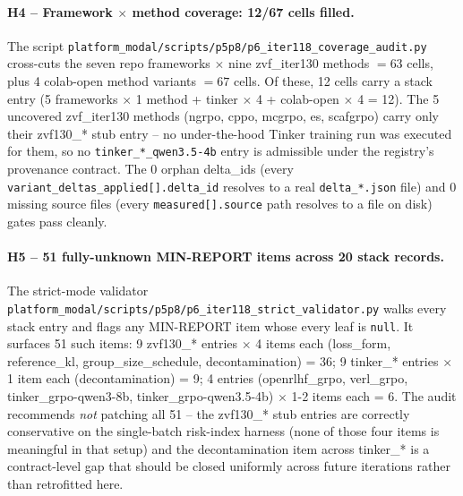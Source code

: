 \paragraph{H4 -- Framework $\times$ method coverage: 12/67 cells filled.}
The script \texttt{platform_modal/scripts/p5p8/p6\_iter118\_coverage\_audit.py} cross-cuts
the seven repo frameworks $\times$ nine zvf\_iter130 methods $= 63$ cells,
plus 4 colab-open method variants $= 67$ cells. Of these, 12 cells carry
a stack entry (5 frameworks $\times$ {1 method} + tinker $\times$ 4 +
colab-open $\times$ 4 = 12). The 5 uncovered zvf\_iter130 methods (ngrpo,
cppo, mcgrpo, es, scafgrpo) carry only their zvf130\_* stub entry -- no
under-the-hood Tinker training run was executed for them, so no
\texttt{tinker\_*\_qwen3.5-4b} entry is admissible under the registry's
provenance contract. The 0 orphan delta\_ids (every
\texttt{variant\_deltas\_applied[].delta\_id} resolves to a real
\texttt{delta\_*.json} file) and 0 missing source files (every
\texttt{measured[].source} path resolves to a file on disk) gates pass
cleanly.

\paragraph{H5 -- 51 fully-unknown MIN-REPORT items across 20 stack records.}
The strict-mode validator \texttt{platform_modal/scripts/p5p8/p6\_iter118\_strict\_validator.py}
walks every stack entry and flags any MIN-REPORT item whose every leaf is
\texttt{null}. It surfaces 51 such items:
9 zvf130\_* entries $\times$ 4 items each (loss\_form, reference\_kl,
group\_size\_schedule, decontamination) = 36; 9 tinker\_* entries
$\times$ 1 item each (decontamination) = 9; 4 entries
(openrlhf\_grpo, verl\_grpo, tinker\_grpo-qwen3-8b, tinker\_grpo-qwen3.5-4b)
$\times$ 1-2 items each = 6. The audit recommends \emph{not} patching all
51 -- the zvf130\_* stub entries are correctly conservative on the
single-batch risk-index harness (none of those four items is meaningful
in that setup) and the decontamination item across tinker\_* is a
contract-level gap that should be closed uniformly across future
iterations rather than retrofitted here.

